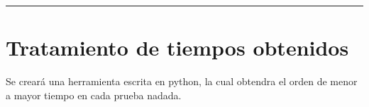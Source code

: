 \vspace{0.5cm}
\hrule

\section{Tratamiento de tiempos obtenidos}
Se creará una herramienta escrita en python, la cual obtendra el orden de menor a mayor tiempo en cada prueba nadada.